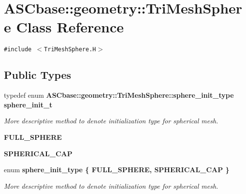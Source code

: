 \section{ASCbase::geometry::Tri\-Mesh\-Sphere Class Reference}
\label{classASCbase_1_1geometry_1_1TriMeshSphere}
{\tt \#include $<$Tri\-Mesh\-Sphere.H$>$}

\subsection*{Public Types}
\begin{CompactItemize}
\item 
typedef enum \bf{ASCbase::geometry::Tri\-Mesh\-Sphere::sphere\_\-init\_\-type} \bf{sphere\_\-init\_\-t}\label{classASCbase_1_1geometry_1_1TriMeshSphere_adaa2f3ea546c14705877efaba422ac5}

\begin{CompactList}\small\item\em More descriptive method to denote initialization type for spherical mesh. \item\end{CompactList}\item 
\textbf{FULL\_\-SPHERE}\label{classASCbase_1_1geometry_1_1TriMeshSphere_1b7e3821daf89de36b78b79203a320545ca923ad9ce9681e6173252423882a51}

\item 
\textbf{SPHERICAL\_\-CAP}\label{classASCbase_1_1geometry_1_1TriMeshSphere_1b7e3821daf89de36b78b79203a3205441ddb124c602b61ac0a60de93ddc2f7d}

\item 
enum \bf{sphere\_\-init\_\-type} \{ \textbf{FULL\_\-SPHERE}, 
\textbf{SPHERICAL\_\-CAP}
 \}
\begin{CompactList}\small\item\em More descriptive method to denote initialization type for spherical mesh. \item\end{CompactList}\end{CompactItemize}
